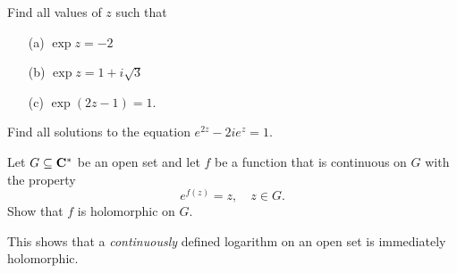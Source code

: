 \vspace{0.1in}

\begin{problem}\label{prob 8.8}
Find all values of $z$ such that
\begin{itemize}
\item[(a)] $\exp z = -2$
\item[(b)] $\exp z = 1 + i\sqrt{3}$
\item[(c)] $\exp(2z - 1) = 1$.
\end{itemize}
\end{problem}

\vspace{0.1in}

\begin{problem}\label{prob 8.9}
Find all solutions to the equation $e^{2z} - 2ie^z = 1$.
\end{problem}

\vspace{0.1in}

\begin{problem}\label{prob 8.10}
Let $G \subseteq \mathbf C^*$ be an open set and let $f$ be a function that is continuous on $G$ with the property
\[e^{f(z)} = z,\quad z \in G.\]
Show that $f$ is holomorphic on $G$.
\begin{remark}
This shows that a \emph{continuously} defined logarithm on an open set is immediately holomorphic.
\end{remark}
\end{problem}